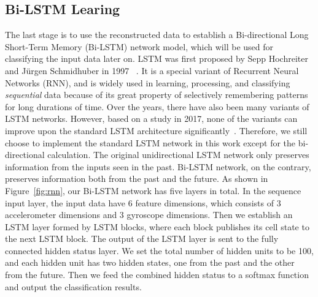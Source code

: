 \subsection{Bi-LSTM Learing}\label{sec:LSTM}

The last stage is to use the reconstructed data to establish a Bi-directional Long Short-Term Memory (Bi-LSTM) network model, which will be used for classifying the input data later on.
%
 LSTM was first proposed by Sepp Hochreiter and J{\"u}rgen Schmidhuber in 1997 ~\cite{hochreiter1997long}. It is a special variant of  Recurrent Neural Networks (RNN), and is widely used in learning, processing, and classifying \textit{sequential } data because of 
its great property of selectively remembering patterns for long durations of time. 
%
Over the years, there have also been many variants of LSTM networks. However, based on a study in 2017, none of the variants can improve upon the standard LSTM architecture significantly~\cite{greff2017lstm}. Therefore, we still choose to implement the standard LSTM network in this work except for the bi-directional calculation. The original unidirectional LSTM network only preserves information from the inputs seen in the past. Bi-LSTM network, on the contrary, preserves information both from the past and the future. 
%
As shown in Figure~\ref{fig:rnn}, our Bi-LSTM network has five layers in total. In the sequence input layer, the input data have 6 feature dimensions, which consists of 3 accelerometer dimensions and 3 gyroscope dimensions. Then we establish an LSTM layer formed by LSTM blocks, where each block publishes its cell state to the next LSTM block. The output of the LSTM layer is sent to the fully connected hidden status layer. We set the total number of hidden units to be 100, and each hidden unit has two hidden states, one from the past and the other from the future. Then we feed the combined hidden status to a softmax function and output the classification results.






